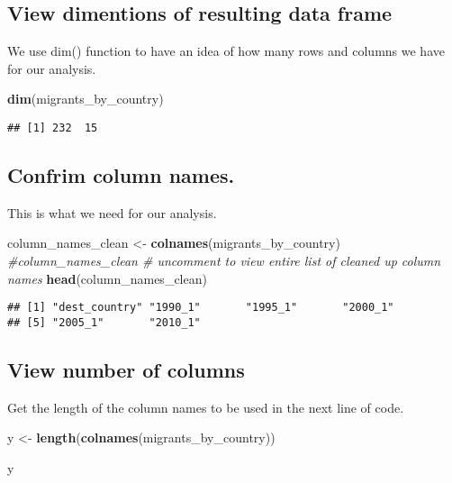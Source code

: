 \documentclass[]{article}
\newenvironment{Shaded}{\begin{snugshade}}{\end{snugshade}}
\newcommand{\KeywordTok}[1]{\textcolor[rgb]{0.13,0.29,0.53}{\textbf{#1}}}
\newcommand{\StringTok}[1]{\textcolor[rgb]{0.31,0.60,0.02}{#1}}
\newcommand{\CommentTok}[1]{\textcolor[rgb]{0.56,0.35,0.01}{\textit{#1}}}
\newcommand{\NormalTok}[1]{#1}
\begin{document}
\subsection{View dimentions of resulting data
frame}\label{view-dimentions-of-resulting-data-frame}

We use dim() function to have an idea of how many rows and columns we
have for our analysis.

\begin{Shaded}
\begin{Highlighting}[]
\KeywordTok{dim}\NormalTok{(migrants_by_country)}
\end{Highlighting}
\end{Shaded}

\begin{verbatim}
## [1] 232  15
\end{verbatim}

\subsection{Confrim column names.}\label{confrim-column-names.}

This is what we need for our analysis.

\begin{Shaded}
\begin{Highlighting}[]
\NormalTok{column_names_clean <-}\StringTok{ }\KeywordTok{colnames}\NormalTok{(migrants_by_country)}
\CommentTok{#column_names_clean # uncomment to view entire list of cleaned up column names}
\KeywordTok{head}\NormalTok{(column_names_clean)}
\end{Highlighting}
\end{Shaded}

\begin{verbatim}
## [1] "dest_country" "1990_1"       "1995_1"       "2000_1"      
## [5] "2005_1"       "2010_1"
\end{verbatim}

\subsection{View number of columns}\label{view-number-of-columns}

Get the length of the column names to be used in the next line of code.

\begin{Shaded}
\begin{Highlighting}[]
\NormalTok{y <-}\StringTok{ }\KeywordTok{length}\NormalTok{(}\KeywordTok{colnames}\NormalTok{(migrants_by_country))}

\NormalTok{y }
\end{Highlighting}
\end{Shaded}
\end{document}
